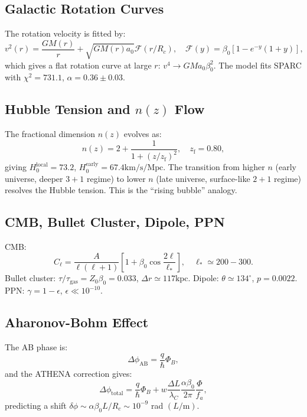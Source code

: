 \documentclass[11pt,a4paper]{article}
\begin{document}
\subsection{Galactic Rotation Curves}
The rotation velocity is fitted by:
\begin{equation}
v^{2}(r) = \frac{GM(r)}{r} +\sqrt{GM(r)a_{0}}\mathcal{F}(r / R_{c}),\quad \mathcal{F}(y) = \beta_{0}\left[1 - e^{-y}(1 + y)\right], \tag{35}
\end{equation}
which gives a flat rotation curve at large \(r\): \(v^{4} \to GMa_{0}\beta_{0}^{2}\). The model fits SPARC with \(\chi^{2} = 731.1\), \(\alpha = 0.36 \pm 0.03\).

\subsection{Hubble Tension and \(n(z)\) Flow}
The fractional dimension \(n(z)\) evolves as:
\begin{equation}
n(z) = 2 + \frac{1}{1 + (z / z_{\mathrm{f}})^{2}},\quad z_{\mathrm{f}} = 0.80, \tag{36}
\end{equation}
giving \(H_{0}^{\mathrm{local}} = 73.2\), \(H_{0}^{\mathrm{early}} = 67.4 \mathrm{km / s / Mpc}\). The transition from higher \(n\) (early universe, deeper \(3+1\) regime) to lower \(n\) (late universe, surface-like \(2+1\) regime) resolves the Hubble tension. This is the ``rising bubble'' analogy.

\subsection{CMB, Bullet Cluster, Dipole, PPN}
CMB:
\begin{equation}
C_{\ell} = \frac{A}{\ell(\ell + 1)}\left[1 + \beta_{0}\cos \frac{2\ell}{\ell_{*}}\right],\quad \ell_{*}\simeq 200 - 300. \tag{37}
\end{equation}
Bullet cluster: \(\tau /\tau_{\mathrm{gas}} = Z_{0}\beta_{0} = 0.033\), \(\Delta r \simeq 117 \mathrm{kpc}\). Dipole: \(\theta \simeq 134^{\circ}\), \(p = 0.0022\). PPN: \(\gamma = 1 - \epsilon\), \(\epsilon \ll 10^{-10}\).

\subsection{Aharonov-Bohm Effect}
The AB phase is:
\begin{equation}
\Delta \phi_{\mathrm{AB}} = \frac{q}{\hbar}\Phi_{B}, \tag{38}
\end{equation}
and the ATHENA correction gives:
\begin{equation}
\Delta \phi_{\mathrm{total}} = \frac{q}{\hbar}\Phi_{B} + w\frac{\Delta L}{\lambda_{C}}\frac{\alpha\beta_{0}}{2\pi}\frac{\Phi}{f_{a}}, \tag{39}
\end{equation}
predicting a shift \(\delta \phi \sim \alpha \beta_{0}L / R_{c} \sim 10^{-9}\) rad \((L / \mathrm{m})\).
\end{document}
